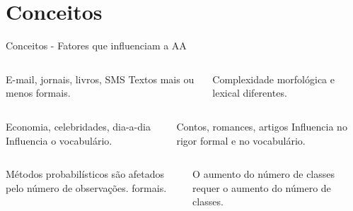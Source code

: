 \section{Conceitos}

\begin{frame}{Conceitos - Fatores que influenciam a AA}

\begin{columns}
	\begin{column}{0.48\textwidth}
		\begin{tcolorbox}[title=Canal,height=2.4cm,valign=center]
			E-mail, jornais, livros, SMS
			\tcblower
			Textos mais ou menos formais.                    
		\end{tcolorbox}
	\end{column}
	\begin{column}{0.48\textwidth}
		\begin{tcolorbox}[title=Idioma,height=2.4cm,valign=center]
			Complexidade morfológica e lexical diferentes.
		\end{tcolorbox}
	\end{column}
\end{columns}
\begin{columns}
	\begin{column}{0.48\textwidth}
		\begin{tcolorbox}[title=Tópico,height=2.4cm,valign=center]
			Economia, celebridades, dia-a-dia
			\tcblower
			Influencia o vocabulário.                    
		\end{tcolorbox}
	\end{column}
	\begin{column}{0.48\textwidth}
		\begin{tcolorbox}[title=Domínio ou Gênero do texto,height=2.4cm,valign=center]
			Contos, romances, artigos
			\tcblower
			Influencia no rigor formal e no vocabulário.
		\end{tcolorbox}
	\end{column}
\end{columns}

\begin{columns}
	\begin{column}{0.48\textwidth}
	\begin{tcolorbox}[title=Tamanho do texto,height=2.4cm,valign=center]
		Métodos probabilísticos são afetados pelo número de observações. formais.                    
	\end{tcolorbox}
	\end{column}
	\begin{column}{0.48\textwidth}
	\begin{tcolorbox}[title=Número de autores,height=2.4cm,valign=center]
	O aumento do número de classes requer o aumento do número de classes.                    
	\end{tcolorbox}
	\end{column}
\end{columns}

\end{frame}






